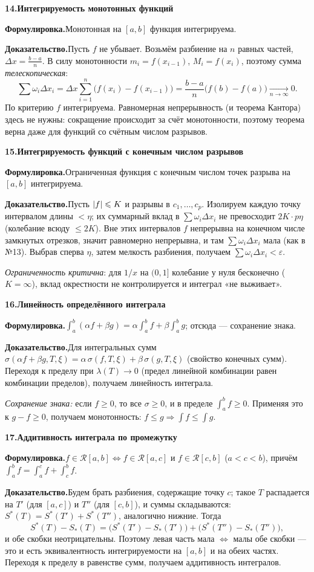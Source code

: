 \documentclass[10pt,a4paper]{article}
\newcommand{\eps}{\varepsilon}
\renewcommand{\le}{\leqslant}
\renewcommand{\ge}{\geqslant}
\DeclarePairedDelimiter{\abs}{\lvert}{\rvert}
\theoremstyle{definition}
\theoremstyle{plain}
\newcommand{\writespace}{\vspace{7.5mm}}
\newcommand{\prf}[2]{%
  \par\writespace\noindent
  {\large\bfseries\color{accent}#1.\enspace #2}\par\smallskip}
\newcommand{\stmt}{\par\noindent\textbf{Формулировка.}\enspace}
\newcommand{\dok}{\par\noindent\textbf{Доказательство.}\enspace}
\begin{document}
\prf{14}{Интегрируемость монотонных функций}
\stmt Монотонная на $[a,b]$ функция интегрируема.

\dok Пусть $f$ не убывает. Возьмём разбиение на $n$ равных частей, $\Delta x=\tfrac{b-a}{n}$. В силу
монотонности $m_i=f(x_{i-1})$, $M_i=f(x_i)$, поэтому сумма \emph{телескопическая}:
\[
  \sum\omega_i\Delta x_i=\Delta x\sum_{i=1}^n\bigl(f(x_i)-f(x_{i-1})\bigr)
  =\frac{b-a}{n}\bigl(f(b)-f(a)\bigr)\xrightarrow[n\to\infty]{}0 .
\]
По критерию $f$ интегрируема. Равномерная непрерывность (и теорема Кантора) здесь не нужны:
сокращение происходит за счёт монотонности, поэтому теорема верна даже для функций со счётным
числом разрывов.

\prf{15}{Интегрируемость функций с конечным числом разрывов}
\stmt Ограниченная функция с конечным числом точек разрыва на $[a,b]$ интегрируема.

\dok Пусть $\abs f\le K$ и разрывы в $c_1,\dots,c_p$. Изолируем каждую точку интервалом длины $<\eta$;
их суммарный вклад в $\sum\omega_i\Delta x_i$ не превосходит $2K\cdot p\eta$ (колебание всюду
$\le2K$). Вне этих интервалов $f$ непрерывна на конечном числе замкнутых отрезков, значит
равномерно непрерывна, и там $\sum\omega_i\Delta x_i$ мала (как в №13). Выбрав сперва $\eta$, затем
мелкость разбиения, получаем $\sum\omega_i\Delta x_i<\eps$.

\emph{Ограниченность критична}: для
$1/x$ на $(0,1]$ колебание у нуля бесконечно ($K=\infty$), вклад окрестности не контролируется и
интеграл «не выживает».

\prf{16}{Линейность определённого интеграла}
\stmt $\int_a^b(\alpha f+\beta g)=\alpha\int_a^b f+\beta\int_a^b g$; отсюда — сохранение знака.

\dok Для интегральных сумм $\sigma(\alpha f+\beta g,T,\xi)=\alpha\,\sigma(f,T,\xi)+\beta\,\sigma(g,T,\xi)$
(свойство конечных сумм). Переходя к пределу при $\lambda(T)\to0$ (предел линейной комбинации равен
комбинации пределов), получаем линейность интеграла.

\emph{Сохранение знака:} если $f\ge0$, то все
$\sigma\ge0$, и в пределе $\int_a^b f\ge0$. Применяя это к $g-f\ge0$, получаем монотонность:
$f\le g\Rightarrow\int f\le\int g$.

\prf{17}{Аддитивность интеграла по промежутку}
\stmt $f\in\mathcal R[a,b]\iff f\in\mathcal R[a,c]$ и $f\in\mathcal R[c,b]$ ($a<c<b$), причём
$\int_a^b f=\int_a^c f+\int_c^b f$.

\dok Будем брать разбиения, содержащие точку $c$; такое $T$ распадается на $T'$ (для $[a,c]$) и
$T''$ (для $[c,b]$), и суммы складываются: $S^*(T)=S^*(T')+S^*(T'')$, аналогично нижние. Тогда
\[
  S^*(T)-S_*(T)=\bigl(S^*(T')-S_*(T')\bigr)+\bigl(S^*(T'')-S_*(T'')\bigr),
\]
и обе скобки неотрицательны. Поэтому левая часть мала $\iff$ малы обе скобки — это и есть
эквивалентность интегрируемости на $[a,b]$ и на обеих частях. Переходя к пределу в равенстве сумм,
получаем аддитивность интегралов.
\end{document}
